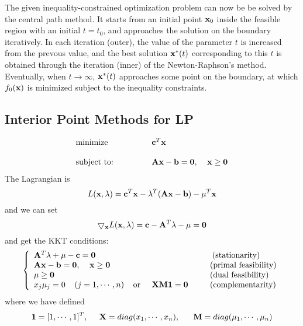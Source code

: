 The given inequality-constrained optimization problem can now be be solved
by the central path method. It starts from an initial point ${\bf x}_0$
inside the feasible region with an initial $t=t_0$, and approaches the 
solution on the boundary iteratively. In each iteration (outer), the value
of the parameter $t$ is increased from the prevous value, and the best 
solution ${\bf x}^*(t)$ corresponding to this $t$ is obtained through the 
iteration (inner) of the Newton-Raphson's method. Eventually, when 
$t\rightarrow\infty$, ${\bf x}^*(t)$ approaches some point on the boundary,
at which $f_0({\bf x})$ is minimized subject to the inequality constraints.


\subsection*{Interior Point Methods for LP}


\begin{equation}
  \begin{array}{ll}
    \mbox{minimize}  &  {\bf c}^T{\bf x}\\
    \;\;\;\;\;\;\;\;\;\;\;\;\;\;\;\;\;\;\;\;\;\;\;\;\;\;\;\;\;\;\\
    \mbox{subject to:} & {\bf Ax}-{\bf b}={\bf 0},\;\;\;\;{\bf x}\ge{\bf 0}
  \end{array}
\end{equation}
The Lagrangian is
\[
L({\bf x},{\bf\lambda})={\bf c}^T{\bf x}-{\bf\lambda}^T({\bf Ax}-{\bf b})
-{\bf\mu}^T{\bf x}
\]
and we can set
\[
\bigtriangledown_{\bf x} L({\bf x},{\bf\lambda})
={\bf c}-{\bf A}^T{\bf\lambda}-{\bf\mu}={\bf 0}
\]
and get the KKT conditions:
\[
\left\{\begin{array}{ll}
{\bf A}^T{\bf\lambda}+{\bf\mu}-{\bf c}={\bf 0}&
\;\;\;\;\;\;\;\mbox{(stationarity)}\\
{\bf Ax}-{\bf b}={\bf 0},\;\;\;\;{\bf x}\ge{\bf 0}&
\;\;\;\;\;\;\mbox{(primal feasibility)}\\
{\bf\mu}\ge{\bf 0}&\;\;\;\;\;\;\mbox{(dual feasibility)}\\
x_j\mu_j=0\;\;\;\;(j=1,\cdots,n)\;\;\;\;\mbox{or}\;\;\;\;\;
{\bf X}{\bf M}{\bf 1}={\bf 0}&\;\;\;\;\;\;\mbox{(complementarity)}
\end{array}\right.
\]
where we have defined
\[
{\bf 1}=[1,\cdots,1]^T,\;\;\;\;\;{\bf X}=diag(x_1,\cdots,x_n),
\;\;\;\;\;\;{\bf M}=diag(\mu_1,\cdots,\mu_n)
\]

